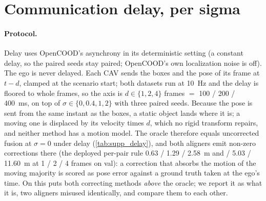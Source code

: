 \section{Communication delay, per sigma}
\label{sec:supp_delay}

\paragraph{Protocol.}
Delay uses OpenCOOD's asynchrony in its deterministic setting (a constant delay, so the paired seeds stay paired; OpenCOOD's own localization noise is off). The ego is never delayed. Each CAV sends the boxes and the pose of its frame at $t-d$, clamped at the scenario start; both datasets run at \SI{10}{Hz} and the delay is floored to whole frames, so the axis is $d\in\{1,2,4\}$ frames $=$ 100 / 200 / \SI{400}{ms}, on top of $\sigma\in\{0,0.4,1,2\}$ with three paired seeds. Because the pose is sent from the same instant as the boxes, a static object lands where it is; a moving one is displaced by its velocity times $d$, which no rigid transform repairs, and neither method has a motion model. The oracle therefore equals uncorrected fusion at $\sigma{=}0$ under delay (\cref{tab:supp_delay}), and both aligners emit non-zero corrections there (the deployed per-pair rule 0.63 / 1.29 / \SI{2.58}{m} and  / 5.03 / \SI{11.60}{m} at 1 / 2 / 4 frames on \opvv val): a correction that absorbs the motion of the moving majority is scored as pose error against a ground truth taken at the ego's time. On \opvv this puts both correcting methods \emph{above} the oracle; we report it as what it is, two aligners misused identically, and compare them to each other.



